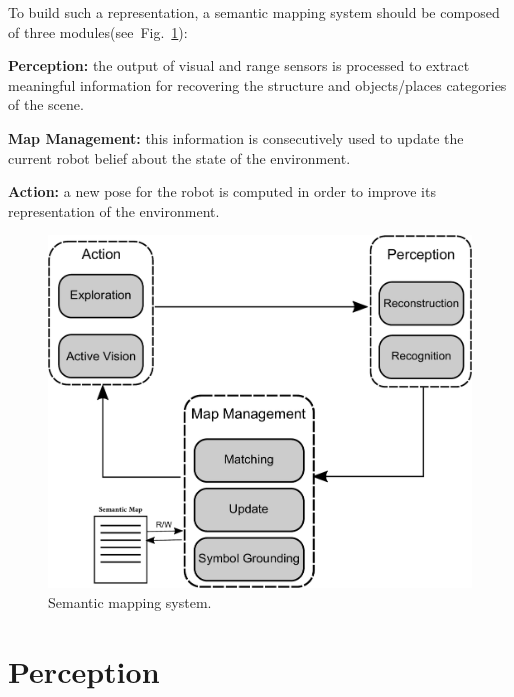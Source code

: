 \documentclass{article}
\def\figref#1{Fig.~\ref{#1}}
\begin{document}
	To build such a representation, a semantic mapping system should be composed of three modules(see~\figref{fig:system}):

	\begin{description}
		\item {\bf Perception:} the output of visual and range sensors is processed to extract meaningful information for recovering the structure and objects/places categories of the scene.
		\item {\bf Map Management:} this information is consecutively used to update the current robot belief about the state of the environment.
		\item {\bf Action:} a new pose for the robot is computed in order to improve its representation of the environment.
	\end{description}

	\begin{figure}[h]
		\centering
		\includegraphics[width=\linewidth]{pics/drawing-crop.pdf}
		\caption{Semantic mapping system.}
		\label{fig:system}
	\end{figure}
		
	\section{Perception}
	
%	
\end{document}
